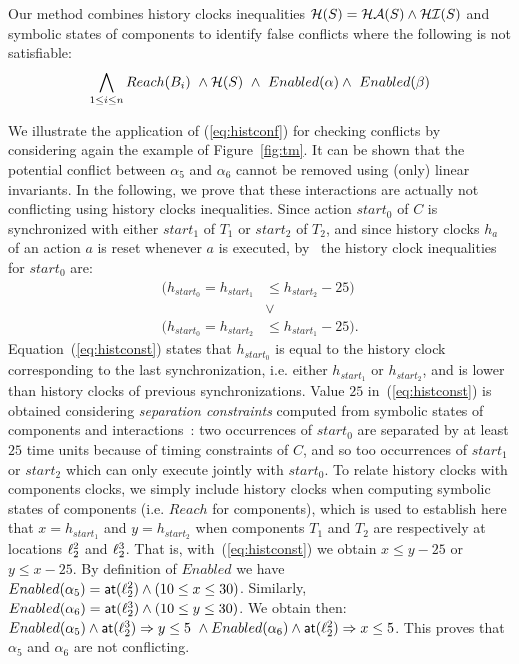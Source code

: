 Our method combines history clocks inequalities $\mathcal{H}(S)=\mathcal{HA}(S)\wedge\mathcal{HI}(S)$ 
and symbolic states of components to identify false conflicts where the following is not
satisfiable:
\begin{equation}\label{eq:histconf}
  \bigwedge_{1 \leq i \leq n} Reach(B_i) \ \wedge \mc{H}(S) \  \wedge \ \enabled{\alpha} 
  \wedge \ \enabled{\beta}
\end{equation}

\begin{example}
We illustrate the application of (\ref{eq:histconf}) for checking conflicts by 
considering again the example of Figure~\ref{fig:tm}.
It can be shown that the potential conflict between $\alpha_5$ and $\alpha_6$ 
cannot be removed using (only) linear invariants.
In the following, we prove that these interactions are actually not conflicting using 
history clocks inequalities.
Since action $start_0$ of $C$ is synchronized with either $start_1$ of $T_1$ or $start_2$ of 
$T_2$, and since history clocks $h_a$ of an action $a$ is reset whenever $a$ is executed, 
by~\cite{souha:hs} the history clock inequalities for $start_0$ are:
\begin{equation}\label{eq:histconst}
\begin{split}
( h_{start_0} = h_{start_1} &\le h_{start_2} - 25 ) \\ 
  &\vee \\ ( h_{start_0} = h_{start_2} &\le h_{start_1} - 25 ).
\end{split}
\end{equation}
Equation~(\ref{eq:histconst}) states that $h_{start_0}$ is equal to the history clock 
corresponding to the last synchronization, i.e. either $h_{start_1}$ or $h_{start_2}$, and is 
lower than history clocks of previous synchronizations. Value $25$ in~(\ref{eq:histconst}) is 
obtained considering \emph{separation constraints} computed from symbolic states of components 
and interactions~\cite{}: two occurrences of $start_0$ are separated by at least $25$ 
time units because of timing constraints of $C$, and so too occurrences of $start_1$ or 
$start_2$ which can only execute jointly with $start_0$.
To relate history clocks with components clocks, we simply include history clocks when 
computing symbolic states of components (i.e. $Reach$ for components), which is used to 
establish here that $x = h_{start_1}$ and $y = h_{start_2}$ when components $T_1$ and $T_2$ 
are respectively at locations $\ell_2^2$ and $\ell_2^3$.
That is, with~(\ref{eq:histconst}) we obtain $x \le y - 25$ or $y \le x - 25$.
  By definition of $Enabled$ we have $Enabled(\alpha_5) = \textsf{at}(\ell_2^2) \wedge 
(10 \leq x \leq 30) $. 
  Similarly, $Enabled(\alpha_6) = \textsf{at}(\ell_2^3) \wedge (10\le y \leq 30)$.
  We obtain then: $Enabled(\alpha_5)\wedge\textsf{at}(\ell_2^3)\Rightarrow y\le5 \
  \wedge Enabled(\alpha_6)\wedge\textsf{at}(\ell_2^2)\Rightarrow x\le5$.
This proves that $\alpha_5$ and $\alpha_6$ are not conflicting. 
\end{example}

